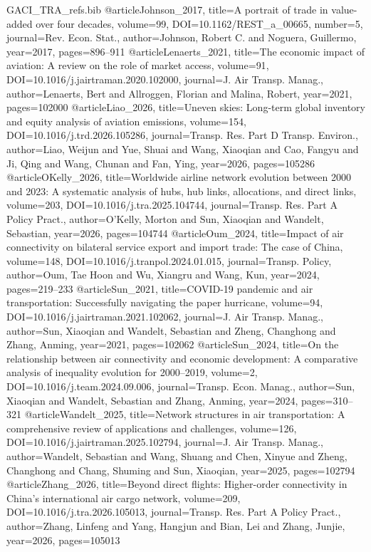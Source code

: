 \begin{filecontents*}[overwrite]{GACI_TRA_refs.bib}
@article{Johnson_2017, title={A portrait of trade in value-added over four decades}, volume={99}, DOI={10.1162/REST_a_00665}, number={5}, journal={Rev. Econ. Stat.}, author={Johnson, Robert C. and Noguera, Guillermo}, year={2017}, pages={896--911} }
@article{Lenaerts_2021, title={The economic impact of aviation: A review on the role of market access}, volume={91}, DOI={10.1016/j.jairtraman.2020.102000}, journal={J. Air Transp. Manag.}, author={Lenaerts, Bert and Allroggen, Florian and Malina, Robert}, year={2021}, pages={102000} }
@article{Liao_2026, title={Uneven skies: Long-term global inventory and equity analysis of aviation emissions}, volume={154}, DOI={10.1016/j.trd.2026.105286}, journal={Transp. Res. Part D Transp. Environ.}, author={Liao, Weijun and Yue, Shuai and Wang, Xiaoqian and Cao, Fangyu and Ji, Qing and Wang, Chunan and Fan, Ying}, year={2026}, pages={105286} }
@article{OKelly_2026, title={Worldwide airline network evolution between 2000 and 2023: A systematic analysis of hubs, hub links, allocations, and direct links}, volume={203}, DOI={10.1016/j.tra.2025.104744}, journal={Transp. Res. Part A Policy Pract.}, author={O'Kelly, Morton and Sun, Xiaoqian and Wandelt, Sebastian}, year={2026}, pages={104744} }
@article{Oum_2024, title={Impact of air connectivity on bilateral service export and import trade: The case of {China}}, volume={148}, DOI={10.1016/j.tranpol.2024.01.015}, journal={Transp. Policy}, author={Oum, Tae Hoon and Wu, Xiangru and Wang, Kun}, year={2024}, pages={219--233} }
@article{Sun_2021, title={{COVID-19} pandemic and air transportation: Successfully navigating the paper hurricane}, volume={94}, DOI={10.1016/j.jairtraman.2021.102062}, journal={J. Air Transp. Manag.}, author={Sun, Xiaoqian and Wandelt, Sebastian and Zheng, Changhong and Zhang, Anming}, year={2021}, pages={102062} }
@article{Sun_2024, title={On the relationship between air connectivity and economic development: A comparative analysis of inequality evolution for 2000--2019}, volume={2}, DOI={10.1016/j.team.2024.09.006}, journal={Transp. Econ. Manag.}, author={Sun, Xiaoqian and Wandelt, Sebastian and Zhang, Anming}, year={2024}, pages={310--321} }
@article{Wandelt_2025, title={Network structures in air transportation: A comprehensive review of applications and challenges}, volume={126}, DOI={10.1016/j.jairtraman.2025.102794}, journal={J. Air Transp. Manag.}, author={Wandelt, Sebastian and Wang, Shuang and Chen, Xinyue and Zheng, Changhong and Chang, Shuming and Sun, Xiaoqian}, year={2025}, pages={102794} }
@article{Zhang_2026, title={Beyond direct flights: Higher-order connectivity in {China}'s international air cargo network}, volume={209}, DOI={10.1016/j.tra.2026.105013}, journal={Transp. Res. Part A Policy Pract.}, author={Zhang, Linfeng and Yang, Hangjun and Bian, Lei and Zhang, Junjie}, year={2026}, pages={105013} }

\end{filecontents*}
